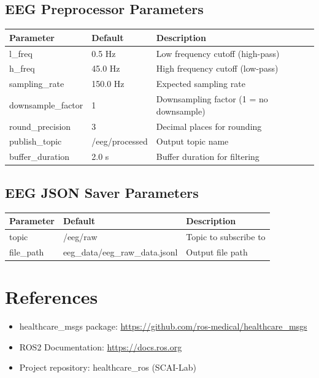 \documentclass[11pt,a4paper]{article}
\begin{document}
\subsection{EEG Preprocessor Parameters}
\begin{longtable}{|>{\small}p{3.5cm}|>{\small}p{2.5cm}|>{\small}p{7cm}|}
\hline
\textbf{Parameter} & \textbf{Default} & \textbf{Description} \\
\hline
l\_freq & 0.5 Hz & Low frequency cutoff (high-pass) \\
h\_freq & 45.0 Hz & High frequency cutoff (low-pass) \\
sampling\_rate & 150.0 Hz & Expected sampling rate \\
downsample\_factor & 1 & Downsampling factor (1 = no downsample) \\
round\_precision & 3 & Decimal places for rounding \\
publish\_topic & /eeg/processed & Output topic name \\
buffer\_duration & 2.0 s & Buffer duration for filtering \\
\hline
\end{longtable}

\subsection{EEG JSON Saver Parameters}
\begin{longtable}{|>{\small}p{3.5cm}|>{\small}p{3cm}|>{\small}p{6.5cm}|}
\hline
\textbf{Parameter} & \textbf{Default} & \textbf{Description} \\
\hline
topic & /eeg/raw & Topic to subscribe to \\
file\_path & eeg\_data/eeg\_raw\_data.jsonl & Output file path \\
\hline
\end{longtable}

\section{References}
\begin{itemize}
    \item healthcare\_msgs package: \url{https://github.com/ros-medical/healthcare_msgs}
    \item ROS2 Documentation: \url{https://docs.ros.org}
    \item Project repository: healthcare\_ros (SCAI-Lab)
\end{itemize}
\end{document}
